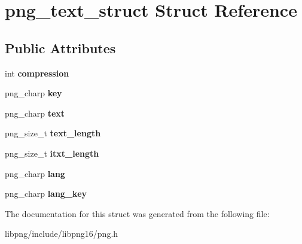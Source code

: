 \hypertarget{structpng__text__struct}{\section{png\-\_\-text\-\_\-struct Struct Reference}
\label{structpng__text__struct}
}
\subsection*{Public Attributes}
\begin{DoxyCompactItemize}
\item 
\hypertarget{structpng__text__struct_ad09c73bc91f014ad352abfbb3b61b8d1}{int {\bfseries compression}}\label{structpng__text__struct_ad09c73bc91f014ad352abfbb3b61b8d1}

\item 
\hypertarget{structpng__text__struct_a99c3063a15889d2fc242f24b69c567ef}{png\-\_\-charp {\bfseries key}}\label{structpng__text__struct_a99c3063a15889d2fc242f24b69c567ef}

\item 
\hypertarget{structpng__text__struct_a27492227bc525bee14abcc8002084edd}{png\-\_\-charp {\bfseries text}}\label{structpng__text__struct_a27492227bc525bee14abcc8002084edd}

\item 
\hypertarget{structpng__text__struct_a26312284ecc7a95e2168a29d0170b411}{png\-\_\-size\-\_\-t {\bfseries text\-\_\-length}}\label{structpng__text__struct_a26312284ecc7a95e2168a29d0170b411}

\item 
\hypertarget{structpng__text__struct_aca3fd6fec58f54460d57ad07182d570d}{png\-\_\-size\-\_\-t {\bfseries itxt\-\_\-length}}\label{structpng__text__struct_aca3fd6fec58f54460d57ad07182d570d}

\item 
\hypertarget{structpng__text__struct_a803048cbecc84ca530d64db6513f4fc6}{png\-\_\-charp {\bfseries lang}}\label{structpng__text__struct_a803048cbecc84ca530d64db6513f4fc6}

\item 
\hypertarget{structpng__text__struct_a61ee3cba011cf3bdefda49f8f9885482}{png\-\_\-charp {\bfseries lang\-\_\-key}}\label{structpng__text__struct_a61ee3cba011cf3bdefda49f8f9885482}

\end{DoxyCompactItemize}


The documentation for this struct was generated from the following file\-:\begin{DoxyCompactItemize}
\item 
libpng/include/libpng16/png.\-h\end{DoxyCompactItemize}
